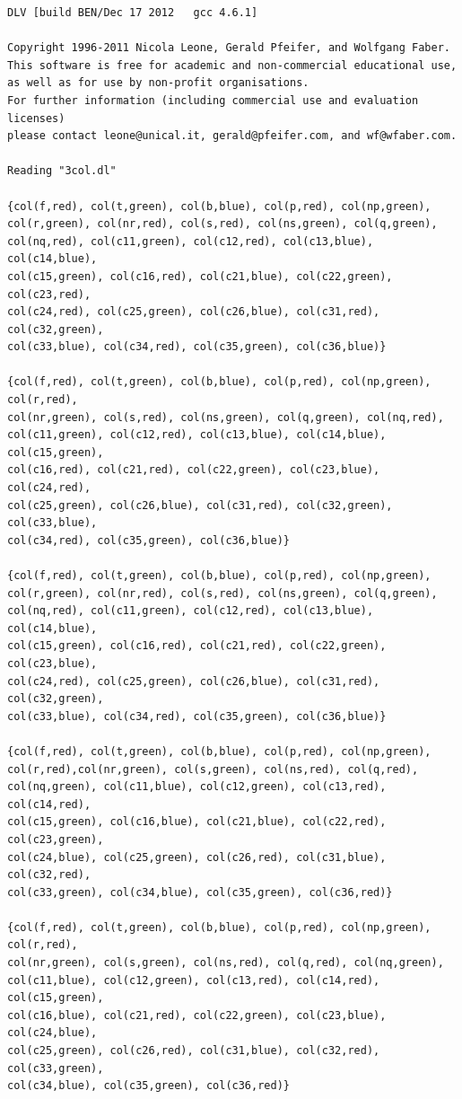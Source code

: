 \documentclass[12pt,fullpage]{article}
\begin{document}
\begin{verbatim}
DLV [build BEN/Dec 17 2012   gcc 4.6.1]

Copyright 1996-2011 Nicola Leone, Gerald Pfeifer, and Wolfgang Faber.
This software is free for academic and non-commercial educational use,
as well as for use by non-profit organisations.
For further information (including commercial use and evaluation licenses)
please contact leone@unical.it, gerald@pfeifer.com, and wf@wfaber.com.

Reading "3col.dl"

{col(f,red), col(t,green), col(b,blue), col(p,red), col(np,green),
col(r,green), col(nr,red), col(s,red), col(ns,green), col(q,green),
col(nq,red), col(c11,green), col(c12,red), col(c13,blue), col(c14,blue),
col(c15,green), col(c16,red), col(c21,blue), col(c22,green), col(c23,red),
col(c24,red), col(c25,green), col(c26,blue), col(c31,red), col(c32,green),
col(c33,blue), col(c34,red), col(c35,green), col(c36,blue)}

{col(f,red), col(t,green), col(b,blue), col(p,red), col(np,green), col(r,red),
col(nr,green), col(s,red), col(ns,green), col(q,green), col(nq,red),
col(c11,green), col(c12,red), col(c13,blue), col(c14,blue), col(c15,green),
col(c16,red), col(c21,red), col(c22,green), col(c23,blue), col(c24,red),
col(c25,green), col(c26,blue), col(c31,red), col(c32,green), col(c33,blue),
col(c34,red), col(c35,green), col(c36,blue)}

{col(f,red), col(t,green), col(b,blue), col(p,red), col(np,green),
col(r,green), col(nr,red), col(s,red), col(ns,green), col(q,green),
col(nq,red), col(c11,green), col(c12,red), col(c13,blue), col(c14,blue),
col(c15,green), col(c16,red), col(c21,red), col(c22,green), col(c23,blue),
col(c24,red), col(c25,green), col(c26,blue), col(c31,red), col(c32,green),
col(c33,blue), col(c34,red), col(c35,green), col(c36,blue)}

{col(f,red), col(t,green), col(b,blue), col(p,red), col(np,green),
col(r,red),col(nr,green), col(s,green), col(ns,red), col(q,red),
col(nq,green), col(c11,blue), col(c12,green), col(c13,red), col(c14,red),
col(c15,green), col(c16,blue), col(c21,blue), col(c22,red), col(c23,green),
col(c24,blue), col(c25,green), col(c26,red), col(c31,blue), col(c32,red),
col(c33,green), col(c34,blue), col(c35,green), col(c36,red)}

{col(f,red), col(t,green), col(b,blue), col(p,red), col(np,green), col(r,red),
col(nr,green), col(s,green), col(ns,red), col(q,red), col(nq,green),
col(c11,blue), col(c12,green), col(c13,red), col(c14,red), col(c15,green),
col(c16,blue), col(c21,red), col(c22,green), col(c23,blue), col(c24,blue),
col(c25,green), col(c26,red), col(c31,blue), col(c32,red), col(c33,green),
col(c34,blue), col(c35,green), col(c36,red)}

\end{verbatim}
\end{document}
